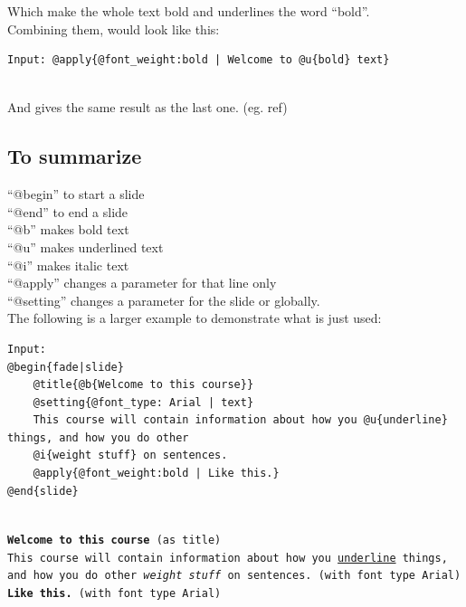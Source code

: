 Which make the whole text bold and underlines the word ``bold''.\\

Combining them, would look like this:\\

\begin{lstlisting}[frame=single]
Input: @apply{@font_weight:bold | Welcome to @u{bold} text}
\end{lstlisting}

 \\

And gives the same result as the last one. (eg. ref)

\subsection*{To summarize}
``@begin'' to start a slide\\
``@end'' to end a slide\\
``@b'' makes bold text \\
``@u'' makes underlined text \\
``@i'' makes italic text \\
``@apply'' changes a parameter for that line only\\
``@setting'' changes a parameter for the slide or globally.\\

The following is a larger example to demonstrate what is just used:\\

\begin{lstlisting}[frame=single]
Input:
@begin{fade|slide}
    @title{@b{Welcome to this course}}
    @setting{@font_type: Arial | text}
    This course will contain information about how you @u{underline} things, and how you do other    
    @i{weight stuff} on sentences.
    @apply{@font_weight:bold | Like this.}
@end{slide}
\end{lstlisting}

\texttt{ \\
\textbf{Welcome to this course} (as title) \\
This course will contain information about how you \underline{underline} things, and how you do other \textit{weight stuff} on sentences. (with font type Arial) \\
\textbf{Like this.}  (with font type Arial)}
\\ \\

